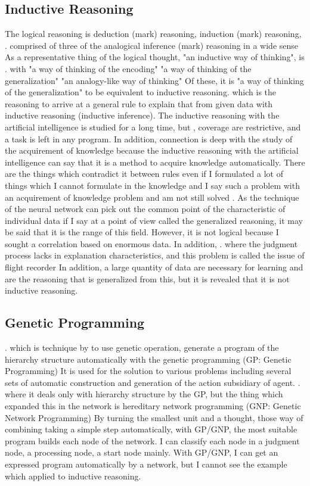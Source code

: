 \documentclass{article}
\begin{document}
\subsection {Inductive Reasoning}
The logical reasoning is deduction (mark) reasoning, induction (mark) reasoning, \cite{math300}. comprised of three of the analogical inference (mark) reasoning in a wide sense
As a representative thing of the logical thought, "an inductive way of thinking", is \cite{saito:11}. with "a way of thinking of the encoding" "a way of thinking of the generalization" "an analogy-like way of thinking"
Of these, it is "a way of thinking of the generalization" to be equivalent to inductive reasoning.
\cite {inductive reasoning} which is the reasoning to arrive at a general rule to explain that from given data with inductive reasoning (inductive inference).
The inductive reasoning with the artificial intelligence is studied for a long time, but \cite{CASE1983193}\cite{4767034}, coverage are restrictive, and a task is left in any program.
In addition, connection is deep with the study of the acquirement of knowledge because the inductive reasoning with the artificial intelligence can say that it is a method to acquire knowledge automatically.
There are the things which contradict it between rules even if I formulated a lot of things which I cannot formulate in the knowledge and I say such a problem with an acquirement of knowledge problem and am not still solved \cite{KnowledgeAI}\cite{KAIssues}.
As the technique of the neural network can pick out the common point of the characteristic of individual data if I say at a point of view called the generalized reasoning, it may be said that it is the range of this field.
However, it is not logical because I sought a correlation based on enormous data.
In addition, \cite{BlackBoxProblem}. where the judgment process lacks in explanation characteristics, and this problem is called the issue of flight recorder
In addition, a large quantity of data are necessary for learning and are the reasoning that is generalized from this, but it is revealed that it is not inductive reasoning.
\subsection {Genetic Programming}
\cite{Koza1994}. which is technique by to use genetic operation, generate a program of the hierarchy structure automatically with the genetic programming (GP: Genetic Programming)
It is used for the solution to various problems including several sets of automatic construction and generation of the action subsidiary of agent.
\cite{gnp}. where it deals only with hierarchy structure by the GP, but the thing which expanded this in the network is hereditary network programming (GNP: Genetic Network Programming)
By turning the smallest unit and a thought, those way of combining taking a simple step automatically, with GP/GNP, the most suitable program builds each node of the network.
I can classify each node in a judgment node, a processing node, a start node mainly.
With GP/GNP, I can get an expressed program automatically by a network, but I cannot see the example which applied to inductive reasoning.
\end{document}

